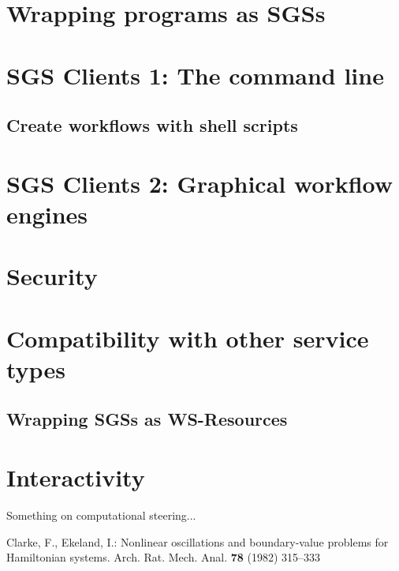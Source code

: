 \documentclass{llncs}
\begin{document}
\section{Wrapping programs as SGSs}
%
\section{SGS Clients 1: The command line}
\subsection{Create workflows with shell scripts}
%
\section{SGS Clients 2: Graphical workflow engines}
%
\section{Security}
%
\section{Compatibility with other service types}
\subsection{Wrapping SGSs as WS-Resources}
%
\section{Interactivity}
Something on computational steering...
%
%
\begin{thebibliography}{refs}
%
%
Clarke, F., Ekeland, I.:
Nonlinear oscillations and
boundary-value problems for Hamiltonian systems.
Arch. Rat. Mech. Anal. {\bf 78} (1982) 315--333

\end{thebibliography}
\end{document}
